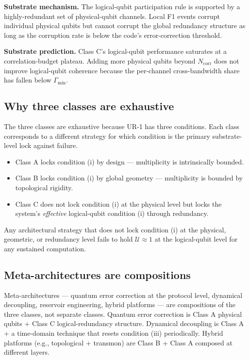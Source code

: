 \documentclass[11pt,a4paper]{article}
\begin{document}
\textbf{Substrate mechanism.} The logical-qubit participation rule is supported by a highly-redundant set of physical-qubit channels. Local F1 events corrupt individual physical qubits but cannot corrupt the global redundancy structure as long as the corruption rate is below the code's error-correction threshold.

\textbf{Substrate prediction.} Class C's logical-qubit performance saturates at a correlation-budget plateau. Adding more physical qubits beyond $N_{\mathrm{corr}}$ does not improve logical-qubit coherence because the per-channel cross-bandwidth share has fallen below $\Gamma_{\min}$.

\subsection{Why three classes are exhaustive}

The three classes are exhaustive because UR-1 has three conditions. Each class corresponds to a different strategy for which condition is the primary substrate-level lock against failure.

\begin{itemize}[noitemsep]
  \item Class A locks condition (i) by design --- multiplicity is intrinsically bounded.
  \item Class B locks condition (i) by global geometry --- multiplicity is bounded by topological rigidity.
  \item Class C does not lock condition (i) at the physical level but locks the system's \emph{effective} logical-qubit condition (i) through redundancy.
\end{itemize}

Any architectural strategy that does not lock condition (i) at the physical, geometric, or redundancy level fails to hold $\mathcal{U} \approx 1$ at the logical-qubit level for any sustained computation.

\subsection{Meta-architectures are compositions}

Meta-architectures --- quantum error correction at the protocol level, dynamical decoupling, reservoir engineering, hybrid platforms --- are compositions of the three classes, not separate classes. Quantum error correction is Class A physical qubits + Class C logical-redundancy structure. Dynamical decoupling is Class A + a time-domain technique that resets condition (iii) periodically. Hybrid platforms (e.g., topological + transmon) are Class B + Class A composed at different layers.
\end{document}
